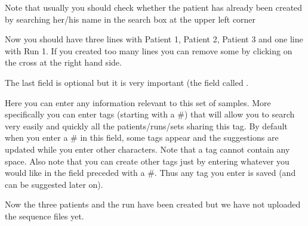 \documentclass[10pt]{article}
\begin{document}
Note that usually you should check whether the patient has
already been created by searching her/his name in the search box at the
upper left corner


  Now you should have three lines with Patient 1, Patient 2, Patient 3 and one
  line with Run 1.
  If you created too many lines you can remove some by clicking on the cross at
  the right hand side.



The last field is optional but it is very important (the field called
.

Here you can enter any information relevant to this set of samples.
More specifically you can enter tags (starting with a \#) that will allow
you to search very easily and quickly all the patients/runs/sets sharing
this tag.
By default when you enter a \# in this field, some tags appear and the
suggestions are  updated while you enter other characters.
Note that a tag cannot contain any space.
Also note that you can create other tags just by entering whatever you would
like in the field preceded with a \#. Thus any tag you enter is saved (and
can be suggested later on).


Now the three patients and the run have been created but we have not uploaded
the sequence files yet.
\end{document}
